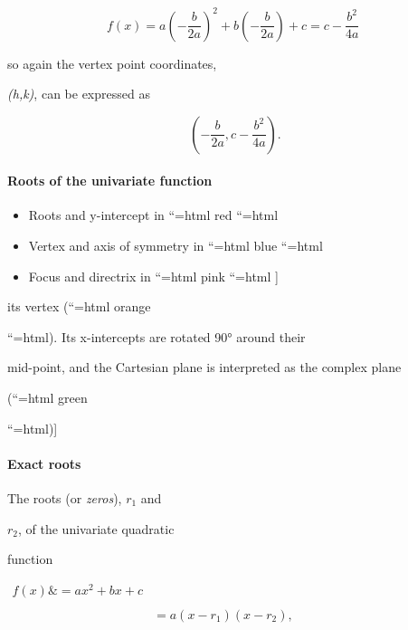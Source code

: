 $$f(x) = a \left (-\frac{b}{2a} \right)^2+b \left (-\frac{b}{2a} \right)+c = c-\frac{b^2}{4a} \,\,$$

so again the vertex point coordinates,

\textit{(h,k)}, can be expressed as



$$\left (-\frac {b}{2a}, c-\frac {b^2}{4a} \right).$$



\paragraph{Roots of the univariate function}



\begin{itemize}
    \item Roots and y-intercept in ``{=html} red ``{=html}
    \item Vertex and axis of symmetry in ``{=html} blue ``{=html}
    \item Focus and directrix in ``{=html} pink ``{=html} ]
\end{itemize}


its vertex (``{=html} orange

``{=html}). Its x-intercepts are rotated 90° around their

mid-point, and the Cartesian plane is interpreted as the complex plane

(``{=html} green

``{=html})]



\paragraph{Exact roots}



The roots (or \textit{zeros}), \textit{$r_1$} and

\textit{$r_2$}, of the univariate quadratic

function



$\begin{aligned}

f(x) \&= ax^2+bx+c \\\\&= a(x-r_1)(x-r_2), \\\\ 

\end{aligned}$



